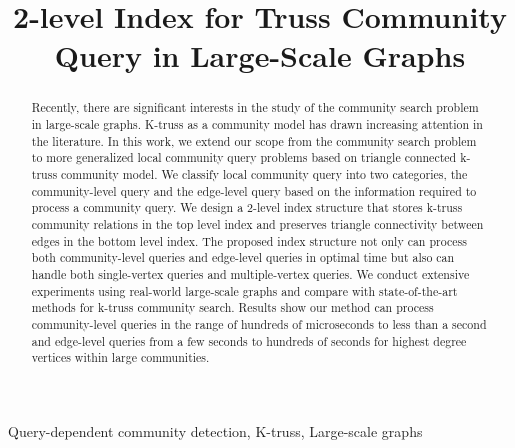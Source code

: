 \documentclass[conference]{IEEEtran}
\newcommand{\toplevelprob}{community-level}
\newcommand{\bottomlevelprob}{edge-level}
\begin{document}
\title{2-level Index for Truss Community Query in Large-Scale Graphs}

\author{
}

\maketitle

\begin{abstract}
Recently, there are significant interests in the study of the community search problem in large-scale graphs. K-truss as a community model has drawn increasing attention in the literature. In this work, we extend our scope from the community search problem to more generalized local community query problems based on triangle connected k-truss community model. We classify local community query into two categories, the \toplevelprob{} query and the \bottomlevelprob{} query based on the information required to process a community query. We design a 2-level index structure that stores k-truss community relations in the top level index and preserves triangle connectivity between edges in the bottom level index. 
The proposed index structure not only can process both \toplevelprob{} queries and \bottomlevelprob{} queries in optimal time but also can handle both single-vertex queries and multiple-vertex queries. We conduct extensive experiments using real-world large-scale graphs and compare with state-of-the-art methods for k-truss community search. Results show our method can process \toplevelprob{} queries in the range of hundreds of microseconds to less than a second and \bottomlevelprob{} queries from a few seconds to hundreds of seconds for highest degree vertices within large communities.
\end{abstract}

\begin{IEEEkeywords}
Query-dependent community detection, K-truss, Large-scale graphs
\end{IEEEkeywords}











%
\end{document}

